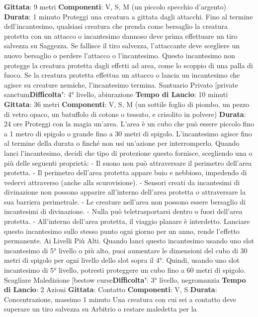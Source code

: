 \begin{multicols}{2}
\textbf{Gittata}: 9 metri
\textbf{Componenti}: V, S, M (un piccolo specchio d’argento)
\textbf{Durata}: 1 minuto
Proteggi una creatura a gittata dagli attacchi. Fino al
termine dell’incantesimo, qualsiasi creatura che prenda
come bersaglio la creatura protetta con un attacco o
incantesimo dannoso deve prima effettuare un tiro
salvezza su Saggezza. Se fallisce il tiro salvezza,
l’attaccante deve scegliere un nuovo bersaglio o
perdere l’attacco o l’incantesimo. Questo incantesimo
non protegge la creatura protetta dagli effetti ad area,
come lo scoppio di una palla di fuoco.
Se la creatura protetta effettua un attacco o lancia un
incantesimo che agisce su creature nemiche,
l’incantesimo termina.
Santuario Privato
[private sanctum\textbf{Difficolta'}:
4° livello, abiurazione
\textbf{Tempo di Lancio}: 10 minuti
\textbf{Gittata}: 36 metri
\textbf{Componenti}: V, S, M (un sottile foglio di piombo, un
pezzo di vetro opaco, un batuffolo di cotone o tessuto, e
crisolito in polvere)
\textbf{Durata}: 24 ore
Proteggi con la magia un’area. L’area è un cubo che
può essere piccolo fino a 1 metro di spigolo o grande
fino a 30 metri di spigolo. L’incantesimo agisce fino al
termine della durata o finché non usi un’azione per
interromperlo.
Quando lanci l’incantesimo, decidi che tipo di
protezione questo fornisce, scegliendo una o più delle
seguenti proprietà:
- Il suono non può attraversare il perimetro dell’area
protetta.
- Il perimetro dell’area protetta appare buio e
nebbioso, impedendo di vedervi attraverso (anche
alla scurovisione).
- Sensori creati da incantesimi di divinazione non
possono apparire all’interno dell’area protetta o
attraversare la sua barriera perimetrale.
- Le creature nell’area non possono essere bersaglio
di incantesimi di divinazione.
- Nulla può teletrasportarsi dentro o fuori dell’area
protetta.
- All’interno dell’area protetta, il viaggio planare è
interdetto.
Lanciare questo incantesimo sullo stesso punto ogni
giorno per un anno, rende l’effetto permanente.
Ai Livelli Più Alti. Quando lanci questo incantesimo
usando uno slot incantesimo di 5° livello o più alto, puoi
aumentare le dimensioni del cubo di 30 metri di spigolo
per ogni livello dello slot sopra il 4°. Quindi, usando uno
slot incantesimo di 5° livello, potresti proteggere un
cubo fino a 60 metri di spigolo.
Scagliare Maledizione
[bestow curse\textbf{Difficolta'}:
3° livello, negromanzia
\textbf{Tempo di Lancio}: 2 Azioni
\textbf{Gittata}: Contatto
\textbf{Componenti}: V, S
\textbf{Durata}: Concentrazione, massimo 1 minuto
Una creatura con cui sei a contatto deve superare un
tiro salvezza su Arbitrio o restare maledetta per la

\end{multicols}
